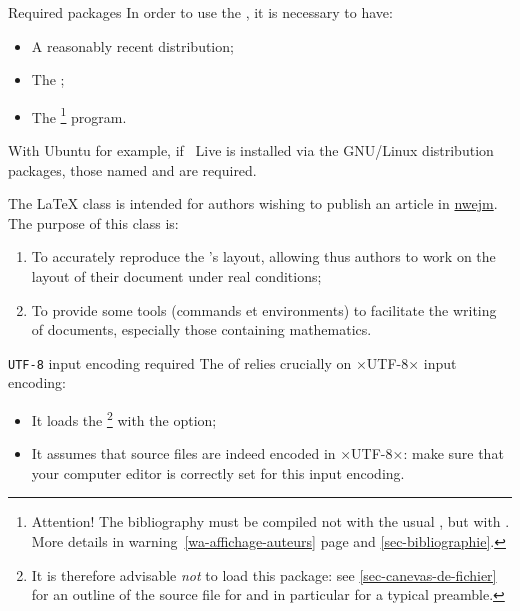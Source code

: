 \documentclass[english,nolocaltoc]{nwejmart}
\newtheorem[style=definition]{fact}
\newtheorem[title-plural=Criteria]{criterion}
\newtheorem[title=random experiment]{rexp}
\begin{document}
\begin{dbwarning}{Required packages}{}
  In order to use the \nwejmauthorcl{}, it is necessary to have:
  \begin{itemize}
  \item A reasonably recent  distribution;
  \item The ;
  \item The
    \href{https://www.ctan.org/pkg/biber}{}\footnote{Attention!
      The bibliography must be compiled not with the usual , but
      with . More details in warning~\ref{wa-affichage-auteurs}
      page \pageref{wa-affichage-auteurs} and \vref{sec-bibliographie}.}
    program.
  \end{itemize}
  With Ubuntu for example, if ~Live is installed via the GNU/Linux distribution packages, those named  and
   are required.
\end{dbwarning}

The \LaTeX{} class \nwejmauthor{} is intended for authors wishing to publish an article in  \href{http://math.univ-lille1.fr/~nwejm/}{\gls{nwejm}}. The purpose of this class is:
\begin{enumerate}
\item To accurately reproduce the \nwejm{}'s layout, allowing thus authors to work on the layout of their document under real conditions;
\item To provide some tools (commands et environments) to facilitate the writing of documents, especially those containing mathematics.
\end{enumerate}

\begin{dbwarning}{\protect\lstinline+UTF-8+ input encoding required}{}
  The \nwejmauthorcl{} of \nwejm{} relies crucially on ×UTF-8× input encoding:
  \begin{itemize}
  \item It loads the \footnote{%
      It is therefore advisable \emph{not} to load this package: see \vref{sec-canevas-de-fichier} for an outline of the source file for \nwejm{} and in particular for a typical preamble.%
    }
    with the  option;
  \item It assumes that   source files are indeed encoded in ×UTF-8×: make sure that your computer editor is correctly set for this input encoding.
  \end{itemize}
\end{dbwarning}
\end{document}
